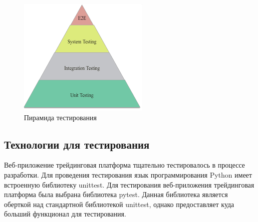 \begin{figure}[ht]
    \centering
    \includegraphics[width=.6\linewidth]{images/testing_piramide}
    \caption{Пирамида тестирования}
    \label{fig:testing:testing_piramide}
\end{figure}


\subsection{Технологии для тестирования}\label{subsec:testing:testing-technologies}

Веб-приложение трейдинговая платформа тщательно тестировалось в процессе разработки.
Для проведения тестирования язык программирования Python имеет встроенную библиотеку unittest.
Для тестирования веб-приложения трейдинговая платформа была выбрана библиотека pytest.
Данная библиотека является оберткой над стандартной библиотекой unittest, однако предоставляет куда больший функционал для тестирования.

